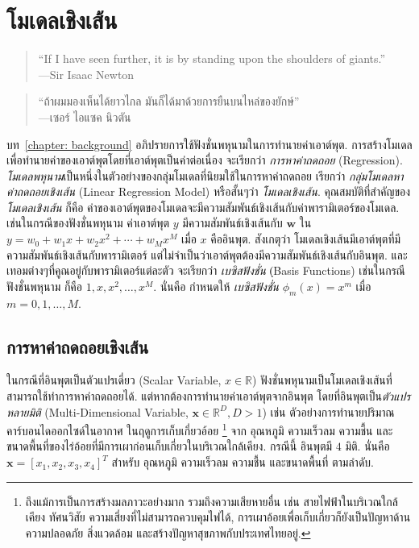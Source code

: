 \chapter{โมเดลเชิงเส้น}
\label{chapter: Linear Models}

\begin{verse}
``If I have seen further, it is by standing upon the shoulders of giants.''\\
---Sir Isaac Newton
\end{verse}

\begin{verse}
``ถ้าผมมองเห็นได้ยาวไกล มันก็ได้มาด้วยการยืนบนไหล่ของยักษ์''\\
---เซอร์ ไอแซค นิวตัน
\end{verse}


บท~\ref{chapter: background} อภิปรายการใช้ฟังชั่นพหุนามในการทำนายค่าเอาต์พุต.
การสร้างโมเดล เพื่อทำนายค่าของเอาต์พุตโดยที่เอาต์พุตเป็นค่าต่อเนื่อง จะเรียกว่า \textit{การหาค่าถดถอย} (Regression).
%
\textit{โมเดลพหุนาม}เป็นหนึ่งในตัวอย่างของกลุ่มโมเดลที่นิยมใช้ในการหาค่าถดถอย 
เรียกว่า \textit{กลุ่มโมเดลหาค่าถดถอยเชิงเส้น} (Linear Regression Model) หรือสั้นๆว่า \textit{โมเดลเชิงเส้น}.
คุณสมบัติที่สำคัญของ\textit{โมเดลเชิงเส้น} ก็คือ 
ค่าของเอาต์พุตของโมเดลจะมีความสัมพันธ์เชิงเส้นกับค่าพารามิเตอร์ของโมเดล.
เช่นในกรณีของฟังชั่นพหุนาม ค่าเอาต์พุต $y$ มีความสัมพันธ์เชิงเส้นกับ $\mathbf{w}$ ใน $y = w_0 + w_1 x + w_2 x^2 + \cdots + w_M x^M$ เมื่อ $x$ คืออินพุต.
สังเกตุว่า โมเดลเชิงเส้นมีเอาต์พุตที่มีความสัมพันธ์เชิงเส้นกับพารามิเตอร์ แต่ไม่จำเป็นว่าเอาต์พุตต้องมีความสัมพันธ์เชิงเส้นกับอินพุต.
และ เทอมต่างๆที่คูณอยู่กับพารามิเตอร์แต่ละตัว จะเรียกว่า \textit{เบซิสฟังชั่น} (ฺBasis Functions) 
เช่นในกรณีฟังชั่นพหุนาม ก็คือ $1, x, x^2, \ldots, x^M$.
นั่นคือ กำหนดให้ \textit{เบซิสฟังชั่น} $\phi_m(x) = x^m$ เมื่อ $m = 0, 1, \ldots, M$.

\section{การหาค่าถดถอยเชิงเส้น}
\label{section: Linear Regression Model}

ในกรณีที่อินพุตเป็นตัวแปรเดี่ยว (Scalar Variable, $x \in \mathbb{R}$) 
ฟังชั่นพหุนามเป็นโมเดลเชิงเส้นที่สามารถใช้ทำการหาค่าถดถอยได้.
แต่หากต้องการทำนายค่าเอาต์พุตจากอินพุต โดยที่อินพุตเป็น\textit{ตัวแปรหลายมิติ} (Multi-Dimensional Variable, $\mathbf{x} \in \mathbb{R}^D, D > 1$) เช่น ตัวอย่างการทำนายปริมาณคาร์บอนไดออกไซด์ในอากาศ ในฤดูการเก็บเกี่ยวอ้อย%
\footnote{ถึงแม้การเป็นการสร้างมลภาวะอย่างมาก รวมถึงความเสียหายอื่น เช่น สายไฟฟ้าในบริเวณใกล้เคียง  ทัศนวิสัย ความเสี่ยงที่ไม่สามารถควบคุมไฟได้, การเผาอ้อยเพื่อเก็บเกี่ยวก็ยังเป็นปัญหาด้านความปลอดภัย สิ่งแวดล้อม และสร้างปัญหาสุขภาพกับประเทศไทยอยู่.} จาก อุณหภูมิ ความเร็วลม ความชื้น และขนาดพื้นที่ของไร่อ้อยที่มีการเผาก่อนเก็บเกี่ยวในบริเวณใกล้เคียง.
กรณีนี้ อินพุตมี $4$ มิติ.
นั่นคือ $\mathbf{x} = [x_1, x_2, x_3, x_4]^T$ สำหรับ อุณหภูมิ ความเร็วลม ความชื้น และขนาดพื้นที่ ตามลำดับ.

